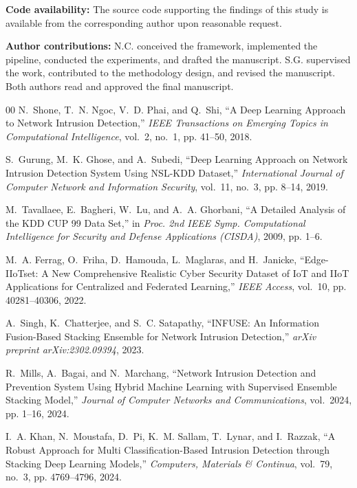 \documentclass[pdflatex,sn-mathphys-num]{sn-jnl}
\theoremstyle{thmstyleone}
\theoremstyle{thmstyletwo}
\theoremstyle{thmstylethree}
\begin{document}
\textbf{Code availability:} The source code supporting the findings of this study is available from the corresponding author upon reasonable request.

\textbf{Author contributions:} N.C. conceived the framework, implemented the pipeline, conducted the experiments, and drafted the manuscript. S.G. supervised the work, contributed to the methodology design, and revised the manuscript. Both authors read and approved the final manuscript.

\begin{thebibliography}{00}
N.~Shone, T.~N. Ngoc, V.~D. Phai, and Q.~Shi, ``A Deep Learning Approach to Network Intrusion Detection,'' \emph{IEEE Transactions on Emerging Topics in Computational Intelligence}, vol.~2, no.~1, pp. 41--50, 2018.

S.~Gurung, M.~K. Ghose, and A.~Subedi, ``Deep Learning Approach on Network Intrusion Detection System Using NSL-KDD Dataset,'' \emph{International Journal of Computer Network and Information Security}, vol.~11, no.~3, pp. 8--14, 2019.

M.~Tavallaee, E.~Bagheri, W.~Lu, and A.~A. Ghorbani, ``A Detailed Analysis of the KDD CUP 99 Data Set,'' in \emph{Proc. 2nd IEEE Symp. Computational Intelligence for Security and Defense Applications (CISDA)}, 2009, pp. 1--6.

M.~A. Ferrag, O.~Friha, D.~Hamouda, L.~Maglaras, and H.~Janicke, ``Edge-IIoTset: A New Comprehensive Realistic Cyber Security Dataset of IoT and IIoT Applications for Centralized and Federated Learning,'' \emph{IEEE Access}, vol.~10, pp. 40281--40306, 2022.

A.~Singh, K.~Chatterjee, and S.~C. Satapathy, ``INFUSE: An Information Fusion-Based Stacking Ensemble for Network Intrusion Detection,'' \emph{arXiv preprint arXiv:2302.09394}, 2023.

R.~Mills, A.~Bagai, and N.~Marchang, ``Network Intrusion Detection and Prevention System Using Hybrid Machine Learning with Supervised Ensemble Stacking Model,'' \emph{Journal of Computer Networks and Communications}, vol.~2024, pp. 1--16, 2024.

I.~A. Khan, N.~Moustafa, D.~Pi, K.~M. Sallam, T.~Lynar, and I.~Razzak, ``A Robust Approach for Multi Classification-Based Intrusion Detection through Stacking Deep Learning Models,'' \emph{Computers, Materials \& Continua}, vol.~79, no.~3, pp. 4769--4796, 2024.


\end{thebibliography}
\end{document}
